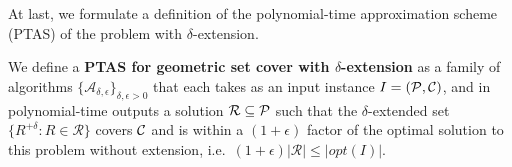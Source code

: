 At last, we formulate a definition of the
polynomial-time approximation scheme (PTAS) of
the problem with $\delta$-extension.

\begin{defi}
We define a \textbf{PTAS for geometric set cover 
with $\delta$-extension} as a family of algorithms
$\{\mathcal{A}_{\delta, \epsilon}\}_{\delta, \epsilon > 0}$ that
each takes as an input instance $I=(\mathcal{P}, \mathcal{C})$,
and in polynomial-time outputs a solution $\mathcal{R} \subseteq \mathcal{P}$
such that the $\delta$-extended set
$\{ R^{+\delta} :  R \in \mathcal{R} \}$ covers $\mathcal{C}$
and is within a $(1+\epsilon)$ factor of the optimal
solution to this problem without
extension, i.e.~$(1+\epsilon)|\mathcal{R}| \le |opt(I)|$.

\end{defi}
